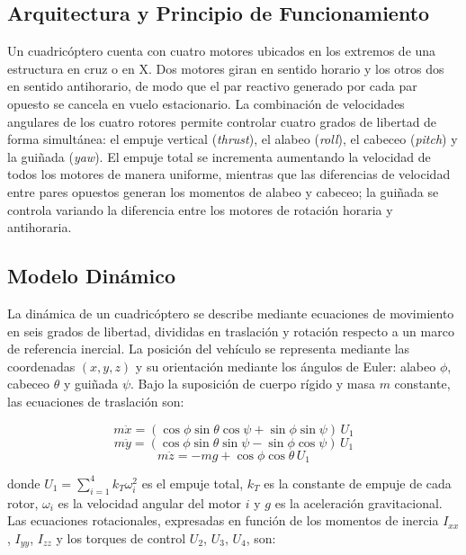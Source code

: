 \subsection{Arquitectura y Principio de Funcionamiento}

Un cuadricóptero cuenta con cuatro motores ubicados en los extremos de una estructura en cruz o en X. Dos motores giran en sentido horario y los otros dos en sentido antihorario, de modo que el par reactivo generado por cada par opuesto se cancela en vuelo estacionario. La combinación de velocidades angulares de los cuatro rotores permite controlar cuatro grados de libertad de forma simultánea: el empuje vertical (\textit{thrust}), el alabeo (\textit{roll}), el cabeceo (\textit{pitch}) y la guiñada (\textit{yaw}). El empuje total se incrementa aumentando la velocidad de todos los motores de manera uniforme, mientras que las diferencias de velocidad entre pares opuestos generan los momentos de alabeo y cabeceo; la guiñada se controla variando la diferencia entre los motores de rotación horaria y antihoraria.

\subsection{Modelo Dinámico}

La dinámica de un cuadricóptero se describe mediante ecuaciones de movimiento en seis grados de libertad, divididas en traslación y rotación respecto a un marco de referencia inercial. La posición del vehículo se representa mediante las coordenadas $(x, y, z)$ y su orientación mediante los ángulos de Euler: alabeo $\phi$, cabeceo $\theta$ y guiñada $\psi$. Bajo la suposición de cuerpo rígido y masa $m$ constante, las ecuaciones de traslación son:

\begin{equation}
m\ddot{x} = (\cos\phi \sin\theta \cos\psi + \sin\phi \sin\psi)\, U_1
\end{equation}
\begin{equation}
m\ddot{y} = (\cos\phi \sin\theta \sin\psi - \sin\phi \cos\psi)\, U_1
\end{equation}
\begin{equation}
m\ddot{z} = -mg + \cos\phi \cos\theta\, U_1
\end{equation}

\noindent donde $U_1 = \sum_{i=1}^{4} k_T \omega_i^2$ es el empuje total, $k_T$ es la constante de empuje de cada rotor, $\omega_i$ es la velocidad angular del motor $i$ y $g$ es la aceleración gravitacional. Las ecuaciones rotacionales, expresadas en función de los momentos de inercia $I_{xx}$, $I_{yy}$, $I_{zz}$ y los torques de control $U_2$, $U_3$, $U_4$, son:

